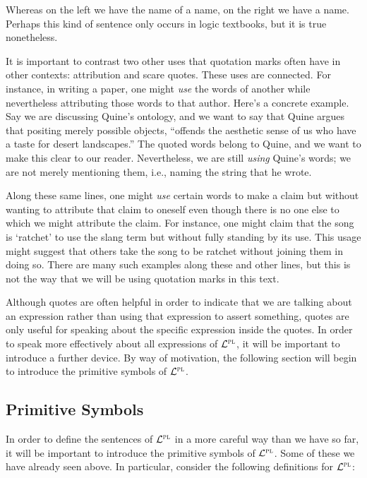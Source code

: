 Whereas on the left we have the name of a name, on the right we have a name.
Perhaps this kind of sentence only occurs in logic textbooks, but it is true nonetheless.

It is important to contrast two other uses that quotation marks often have in other contexts: attribution and scare quotes.
These uses are connected.
For instance, in writing a paper, one might \textit{use} the words of another while nevertheless attributing those words to that author.
Here's a concrete example.
Say we are discussing Quine's ontology, and we want to say that Quine argues that positing merely possible objects, ``offends the aesthetic sense of us who have a taste for desert landscapes.''
The quoted words belong to Quine, and we want to make this clear to our reader.
Nevertheless, we are still \textit{using} Quine's words; we are not merely mentioning them, i.e., naming the string that he wrote.

Along these same lines, one might \textit{use} certain words to make a claim but without wanting to attribute that claim to oneself even though there is no one else to which we might attribute the claim.
For instance, one might claim that the song is `ratchet' to use the slang term but without fully standing by its use.
This usage might suggest that others take the song to be ratchet without joining them in doing so.
There are many such examples along these and other lines, but this is not the way that we will be using quotation marks in this text.

Although quotes are often helpful in order to indicate that we are talking about an expression rather than using that expression to assert something, quotes are only useful for speaking about the specific expression inside the quotes.
In order to speak more effectively about all expressions of $\mathcal{L}^{\textsc{pl}}$, it will be important to introduce a further device. 
By way of motivation, the following section will begin to introduce the primitive symbols of $\mathcal{L}^{\textsc{pl}}$.




\subsection{Primitive Symbols}
  \label{sub:primitives}

In order to define the sentences of $\mathcal{L}^{\textsc{pl}}$ in a more careful way than we have so far, it will be important to introduce the primitive symbols of $\mathcal{L}^{\textsc{pl}}$. 
Some of these we have already seen above.
In particular, consider the following definitions for $\mathcal{L}^{\textsc{pl}}$:

